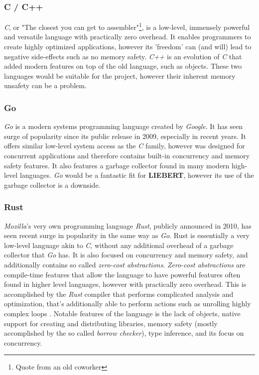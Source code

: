         \subsubsection{C / C++}
            \textit{C}, or "The closest you can get to assembler"\footnote{Quote from an old coworker}, is a low-level, immensely powerful and versatile language with practically zero overhead. It enables programmers to create highly optimized applications, however its 'freedom' can (and will) lead to negative side-effects such as no memory safety. \textit{C++} is an evolution of \textit{C} that added modern features on top of the old language, such as objects. These two languages would be suitable for the project, however their inherent memory unsafety can be a problem.

        \subsubsection{Go}
            \textit{Go} is a modern systems programming language created by \textit{Google}. It has seen surge of popularity since its public release in 2009, especially in recent years. It offers similar low-level system access as the \textit{C} family, however was designed for concurrent applications and therefore contains built-in concurrency and memory safety features. It also features a garbage collector found in many modern high-level languages. \textit{Go} would be a fantastic fit for \textbf{LIEBERT}, however its use of the garbage collector is a downside.

        \subsubsection{Rust}
            \textit{Mozilla}'s very own programming language \textit{Rust}, publicly announced in 2010, has seen recent surge in popularity in the same way as \textit{Go}. Rust is essentially a very low-level language akin to \textit{C}, without any additional overhead of a garbage collector that \textit{Go} has. It is also focused on concurrency and memory safety, and additionally contains so called \textit{zero-cost abstractions}. \textit{Zero-cost abstractions} are compile-time features that allow the language to have powerful features often found in higher level languages, however with practically zero overhead. This is accomplished by the \textit{Rust} compiler that performs complicated analysis and optimization, that's additionally able to perform actions such as unrolling highly complex loops \citep{asseldonk}. Notable features of the language is the lack of objects, native support for creating and distributing libraries, memory safety (mostly accomplished by the so called \textit{borrow checker}), type inference, and its focus on concurrency.

